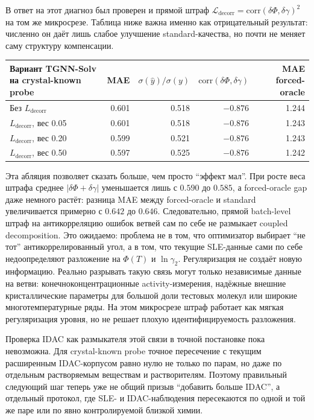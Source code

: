 \documentclass[11pt]{article}
\newcommand{\abs}[1]{\left\lvert #1 \right\rvert}
\theoremstyle{definition}
\begin{document}
В ответ на этот диагноз был проверен и прямой штраф
\(
\mathcal L_{\mathrm{decorr}}=\mathrm{corr}(\delta\Phi,\delta\gamma)^2
\)
на том же микросрезе. Таблица ниже важна именно как отрицательный результат: численно он даёт лишь слабое улучшение standard-качества, но почти не меняет саму структуру компенсации.

\begin{center}
\small
\begin{tabularx}{\textwidth}{P{0.32\textwidth}rrrr}
\toprule
Вариант TGNN-Solv на crystal-known probe & MAE & $\sigma(\hat y)/\sigma(y)$ & $\mathrm{corr}(\delta\Phi,\delta\gamma)$ & MAE forced-oracle \\
\midrule
Без $L_{\mathrm{decorr}}$ & 0.601 & 0.518 & $-0.876$ & 1.244 \\
$L_{\mathrm{decorr}}$, вес 0.05 & 0.601 & 0.518 & $-0.876$ & 1.243 \\
$L_{\mathrm{decorr}}$, вес 0.20 & 0.599 & 0.521 & $-0.876$ & 1.243 \\
$L_{\mathrm{decorr}}$, вес 0.50 & 0.597 & 0.525 & $-0.876$ & 1.242 \\
\bottomrule
\end{tabularx}
\end{center}

Эта абляция позволяет сказать больше, чем просто ``эффект мал''. При росте веса штрафа среднее $\abs{\delta\Phi+\delta\gamma}$ уменьшается лишь с $0.590$ до $0.585$, а forced-oracle gap даже немного растёт: разница MAE между forced-oracle и standard увеличивается примерно с $0.642$ до $0.646$. Следовательно, прямой batch-level штраф на антикорреляцию ошибок ветвей сам по себе не размыкает coupled decomposition. Это ожидаемо: проблема не в том, что оптимизатор выбирает ``не тот'' антикоррелированный угол, а в том, что текущие SLE-данные сами по себе недоопределяют разложение на $\Phi(T)$ и $\ln\gamma_2$. Регуляризация не создаёт новую информацию. Реально разрывать такую связь могут только независимые данные на ветви: конечноконцентрационные activity-измерения, надёжные внешние кристаллические параметры для большой доли тестовых молекул или широкие многотемпературные ряды. На этом микросрезе штраф работает как мягкая регуляризация уровня, но не решает плохую идентифицируемость разложения.

Проверка IDAC как размыкателя этой связи в точной постановке пока невозможна. Для crystal-known probe точное пересечение с текущим расширенным IDAC-корпусом равно нулю не только по парам, но даже по отдельным растворяемым веществам и растворителям. Поэтому правильный следующий шаг теперь уже не общий призыв ``добавить больше IDAC'', а отдельный протокол, где SLE- и IDAC-наблюдения пересекаются по одной и той же паре или по явно контролируемой близкой химии.
\end{document}
